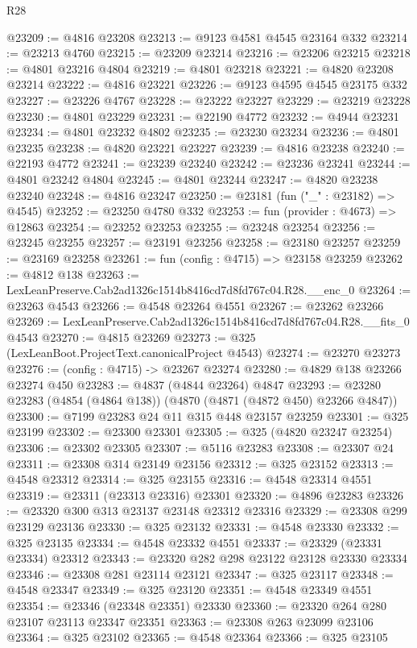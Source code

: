 \begin{lexlean}{R28}
\begin{coremodule}
@23209 := @4816 @23208
@23213 := @9123 @4581 @4545 @23164 @332
@23214 := @23213 @4760
@23215 := @23209 @23214
@23216 := @23206 @23215
@23218 := @4801 @23216 @4804
@23219 := @4801 @23218
@23221 := @4820 @23208 @23214
@23222 := @4816 @23221
@23226 := @9123 @4595 @4545 @23175 @332
@23227 := @23226 @4767
@23228 := @23222 @23227
@23229 := @23219 @23228
@23230 := @4801 @23229
@23231 := @22190 @4772
@23232 := @4944 @23231
@23234 := @4801 @23232 @4802
@23235 := @23230 @23234
@23236 := @4801 @23235
@23238 := @4820 @23221 @23227
@23239 := @4816 @23238
@23240 := @22193 @4772
@23241 := @23239 @23240
@23242 := @23236 @23241
@23244 := @4801 @23242 @4804
@23245 := @4801 @23244
@23247 := @4820 @23238 @23240
@23248 := @4816 @23247
@23250 := @23181 (fun ("_" : @23182) => @4545)
@23252 := @23250 @4780 @332
@23253 := fun (provider : @4673) => @12863
@23254 := @23252 @23253
@23255 := @23248 @23254
@23256 := @23245 @23255
@23257 := @23191 @23256
@23258 := @23180 @23257
@23259 := @23169 @23258
@23261 := fun (config : @4715) => @23158 @23259
@23262 := @4812 @138
@23263 := LexLeanPreserve.Cab2ad1326c1514b8416cd7d8fd767c04.R28.__enc_0
@23264 := @23263 @4543
@23266 := @4548 @23264 @4551
@23267 := @23262 @23266
@23269 := LexLeanPreserve.Cab2ad1326c1514b8416cd7d8fd767c04.R28.__fits_0 @4543
@23270 := @4815 @23269
@23273 := @325 (LexLeanBoot.ProjectText.canonicalProject @4543)
@23274 := @23270 @23273
@23276 := (config : @4715) -> @23267 @23274
@23280 := @4829 @138 @23266 @23274 @450
@23283 := @4837 (@4844 @23264) @4847
@23293 := @23280 @23283 (@4854 (@4864 @138)) (@4870 (@4871 (@4872 @450) @23266 @4847))
@23300 := @7199 @23283 @24 @11 @315 @448 @23157 @23259
@23301 := @325 @23199
@23302 := @23300 @23301
@23305 := @325 (@4820 @23247 @23254)
@23306 := @23302 @23305
@23307 := @5116 @23283
@23308 := @23307 @24
@23311 := @23308 @314 @23149 @23156
@23312 := @325 @23152
@23313 := @4548 @23312
@23314 := @325 @23155
@23316 := @4548 @23314 @4551
@23319 := @23311 (@23313 @23316) @23301
@23320 := @4896 @23283
@23326 := @23320 @300 @313 @23137 @23148 @23312 @23316
@23329 := @23308 @299 @23129 @23136
@23330 := @325 @23132
@23331 := @4548 @23330
@23332 := @325 @23135
@23334 := @4548 @23332 @4551
@23337 := @23329 (@23331 @23334) @23312
@23343 := @23320 @282 @298 @23122 @23128 @23330 @23334
@23346 := @23308 @281 @23114 @23121
@23347 := @325 @23117
@23348 := @4548 @23347
@23349 := @325 @23120
@23351 := @4548 @23349 @4551
@23354 := @23346 (@23348 @23351) @23330
@23360 := @23320 @264 @280 @23107 @23113 @23347 @23351
@23363 := @23308 @263 @23099 @23106
@23364 := @325 @23102
@23365 := @4548 @23364
@23366 := @325 @23105

\end{coremodule}
\end{lexlean}
